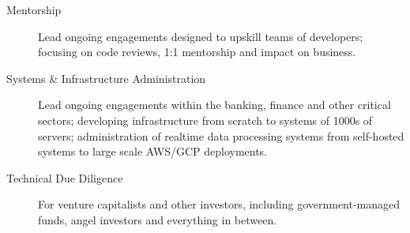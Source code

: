 \begin{langen}
\begin{description}%
\item[Mentorship] Lead ongoing engagements designed to upskill teams of developers; focusing on code reviews, 1:1 mentorship and impact on business.
\item[Systems \& Infrastructure Administration] Lead ongoing engagements within the banking, finance and other critical sectors; developing infrastructure from scratch to systems of 1000s of servers; administration of realtime data processing systems from self-hosted systems to large scale AWS/GCP deployments.
\item[Technical Due Diligence] For venture capitalists and other investors, including government-managed funds, angel investors and everything in between.
\end{description}
\end{langen}

\vspace{4 mm}

